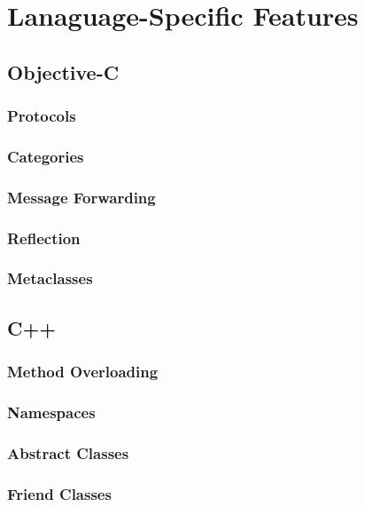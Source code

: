 \documentclass[11pt, a4paper, twocolumn]{article}
\begin{document}
\section{Lanaguage-Specific \-Features}
\subsection{Objective-C}
\subsubsection{Protocols}
\label{sec:protocol}

\subsubsection{Categories}
\label{sec:categories}

\subsubsection{Message Forwarding}
\label{sec:message}

\subsubsection{Reflection}
\label{sec:reflection}

\subsubsection{Metaclasses}
\label{sec:meta}

\subsection{C++}
\subsubsection{Method Overloading}
\label{sec:overloading}

\subsubsection{Namespaces}
\label{sec:namespaces}

\subsubsection{Abstract Classes}
\label{sec:abstract}

\subsubsection{Friend Classes}
\label{sec:friend}
\end{document}
